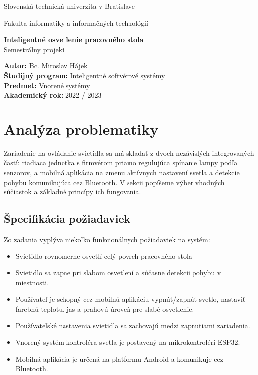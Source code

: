 \documentclass[12pt, a4paper]{article}
\begin{document}
\begin{titlepage}
{\centering
   {\Large Slovenská technická univerzita v Bratislave}\par
   {\Large Fakulta informatiky a informačných technológií}\par
   \vspace{\medskipamount}
   \vfill
   \LARGE \textbf{Inteligentné osvetlenie pracovného stola} \\
   \vspace{0.7\bigskipamount}
   {\Large Semestrálny projekt}\par
   \vfill
}
\normalsize   
\begin{flushleft}
\textbf{Autor:} Bc. Miroslav Hájek \\
\textbf{Študijný program:} Inteligentné softvérové systémy \\
\textbf{Predmet:} Vnorené systémy \\
\textbf{Akademický rok:} 2022 / 2023 \\
\end{flushleft}
\end{titlepage}

\thispagestyle{empty}


\tableofcontents
\newpage

\setcounter{page}{1}

\section{Analýza problematiky}
Zariadenie na ovládanie svietidla sa má skladať z dvoch nezávislých integrovaných častí: riadiaca jednotka s firmvérom priamo regulujúca spínanie lampy podľa senzorov, a mobilná aplikácia na zmenu aktívnych nastavení svetla a detekcie pohybu komunikujúca cez Bluetooth. V sekcii popíšeme výber vhodných súčiastok a základné princípy ich fungovania.

\subsection{Špecifikácia požiadaviek}
Zo zadania vyplýva niekoľko funkcionálnych požiadaviek na systém:
\begin{itemize}
\itemsep0pt
\item Svietidlo rovnomerne osvetlí celý povrch pracovného stola.
\item Svietidlo sa zapne pri slabom osvetlení a súčasne detekcii pohybu v miestnosti.
\item Používateľ je schopný cez mobilnú aplikáciu vypnúť/zapnúť svetlo, nastaviť farebnú teplotu, jas a prahovú úroveň pre slabé osvetlenie.
\item Používateľské nastavenia svietidla sa zachovajú medzi zapnutiami zariadenia.
\item Vnorený systém kontroléra svetla je postavený na mikrokontroléri ESP32.
\item Mobilná aplikácia je určená na platformu Android a komunikuje cez Bluetooth.
\end{itemize}
\end{document}
